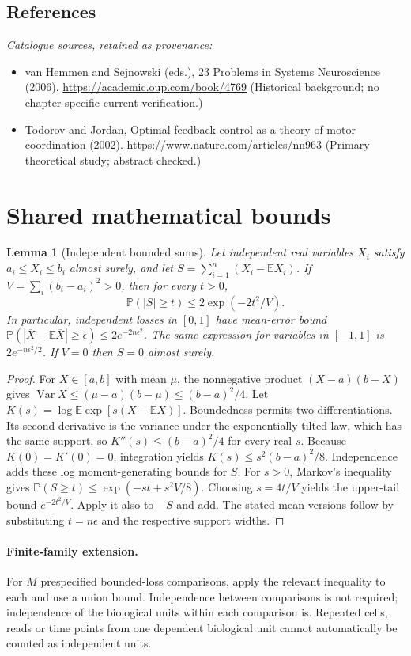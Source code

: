 \documentclass[11pt]{article}
\newcommand{\E}{\mathbb E}
\newcommand{\Prob}{\mathbb P}
\DeclareMathOperator{\Var}{Var}
\providecommand{\E}{\mathbb E}
\providecommand{\Prob}{\mathbb P}
\providecommand{\Var}{\operatorname{Var}}
\newtheorem{sharedlemma}{Lemma}[section]
\begin{document}
\subsection{References}
\noindent\emph{Catalogue sources, retained as provenance:}
\begin{itemize}
\item van Hemmen and Sejnowski (eds.), 23 Problems in Systems Neuroscience (2006). \url{https://academic.oup.com/book/4769} (Historical background; no chapter-specific current verification.)
\item Todorov and Jordan, Optimal feedback control as a theory of motor coordination (2002). \url{https://www.nature.com/articles/nn963} (Primary theoretical study; abstract checked.)
\end{itemize}
\clearpage


\appendix
\section{Shared mathematical bounds}\label{app:bounds}
\begin{sharedlemma}[Independent bounded sums]\label{lem:bounded}
Let independent real variables $X_i$ satisfy $a_i\leq X_i\leq b_i$ almost surely,
and let $S=\sum_{i=1}^n(X_i-\E X_i)$. If
$V=\sum_i(b_i-a_i)^2>0$, then for every $t>0$,
\[
 \Prob(|S|\geq t)\leq 2\exp(-2t^2/V).
\]
In particular, independent losses in $[0,1]$ have mean-error bound
$\Prob(|\overline X-\E\overline X|\geq\epsilon)
\leq2e^{-2n\epsilon^2}$. The same expression for variables in $[-1,1]$
is $2e^{-n\epsilon^2/2}$. If $V=0$ then $S=0$ almost surely.
\end{sharedlemma}
\begin{proof}
For $X\in[a,b]$ with mean $\mu$, the nonnegative product
$(X-a)(b-X)$ gives
$\Var X\leq(\mu-a)(b-\mu)\leq(b-a)^2/4$.
Let $K(s)=\log\E\exp[s(X-\E X)]$.
Boundedness permits two differentiations. Its second derivative is the variance
under the exponentially tilted law, which has the same support, so
$K''(s)\leq(b-a)^2/4$ for every real $s$.
Because $K(0)=K'(0)=0$, integration yields
$K(s)\leq s^2(b-a)^2/8$.
Independence adds these log moment-generating bounds for $S$.
For $s>0$, Markov's inequality gives
$\Prob(S\geq t)\leq\exp(-st+s^2V/8)$.
Choosing $s=4t/V$ yields the upper-tail bound $e^{-2t^2/V}$.
Apply it also to $-S$ and add. The stated mean versions follow by substituting
$t=n\epsilon$ and the respective support widths.
\end{proof}

\paragraph{Finite-family extension.}
For $M$ prespecified bounded-loss comparisons, apply the relevant inequality to
each and use a union bound. Independence between comparisons is not required;
independence of the biological units within each comparison is. Repeated cells,
reads or time points from one dependent biological unit cannot automatically be
counted as independent units.
\end{document}
